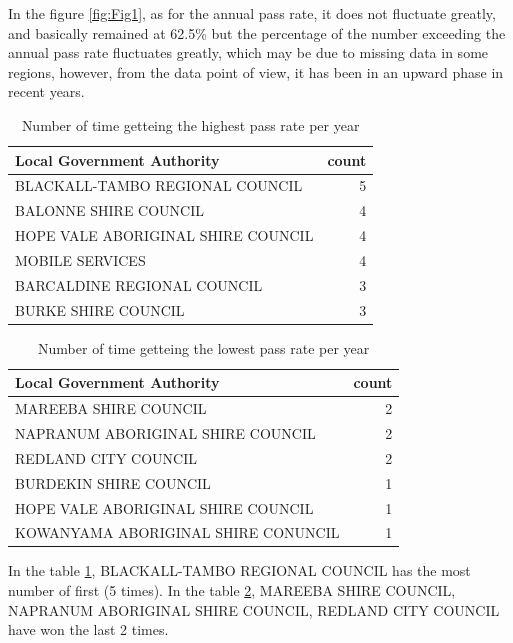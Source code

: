 \documentclass[11pt,a4paper,]{article}
\begin{document}
In the figure \ref{fig:Fig1}, as for the annual pass rate, it does not fluctuate greatly, and basically remained at 62.5\% but the percentage of the number exceeding the annual pass rate fluctuates greatly, which may be due to missing data in some regions, however, from the data point of view, it has been in an upward phase in recent years.

\begin{table}

\caption{\label{tab:Tab1}Number of time getteing the highest pass rate per year}
\centering
\begin{tabular}[t]{lr}
\toprule
Local Government Authority & count\\
\midrule
BLACKALL-TAMBO REGIONAL COUNCIL & 5\\
BALONNE SHIRE COUNCIL & 4\\
HOPE VALE ABORIGINAL SHIRE COUNCIL & 4\\
MOBILE SERVICES & 4\\
BARCALDINE REGIONAL COUNCIL & 3\\
\addlinespace
BURKE SHIRE COUNCIL & 3\\
\bottomrule
\end{tabular}
\end{table}

\begin{table}

\caption{\label{tab:Tab2}Number of time getteing the lowest pass rate per year}
\centering
\begin{tabular}[t]{lr}
\toprule
Local Government Authority & count\\
\midrule
MAREEBA SHIRE COUNCIL & 2\\
NAPRANUM ABORIGINAL SHIRE COUNCIL & 2\\
REDLAND CITY COUNCIL & 2\\
BURDEKIN SHIRE COUNCIL & 1\\
HOPE VALE ABORIGINAL SHIRE COUNCIL & 1\\
\addlinespace
KOWANYAMA ABORIGINAL SHIRE CONUNCIL & 1\\
\bottomrule
\end{tabular}
\end{table}

In the table \ref{tab:Tab1}, BLACKALL-TAMBO REGIONAL COUNCIL has the most number of first (5 times). In the table \ref{tab:Tab2}, MAREEBA SHIRE COUNCIL, NAPRANUM ABORIGINAL SHIRE COUNCIL, REDLAND CITY COUNCIL have won the last 2 times.
\end{document}
